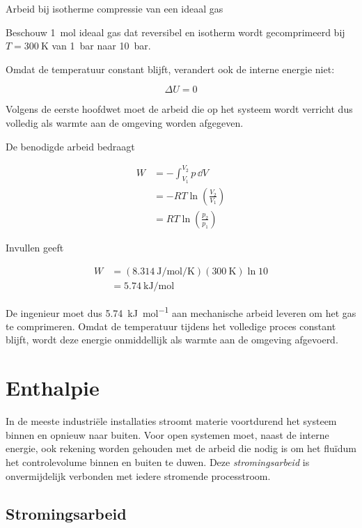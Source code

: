 \begin{voorbeeld}{Arbeid bij isotherme compressie van een ideaal gas}

Beschouw \SI{1}{\mole} ideaal gas dat reversibel en isotherm wordt gecomprimeerd bij
$T=\SI{300}{\kelvin}$ van \SI{1}{\bar} naar \SI{10}{\bar}.

Omdat de temperatuur constant blijft, verandert ook de interne energie niet:

\[
\Delta U=0
\]

Volgens de eerste hoofdwet moet de arbeid die op het systeem wordt verricht dus volledig als warmte aan de omgeving worden afgegeven.

De benodigde arbeid bedraagt

\begin{align*}
W
&= -\int_{V_1}^{V_2}p\,\dd V \\
&= -RT\ln\left(\frac{V_2}{V_1}\right) \\
&= RT\ln\left(\frac{p_2}{p_1}\right)
\end{align*}

Invullen geeft

\begin{align*}
W
&= (\SI{8.314}{\joule\per\mole\per\kelvin}) (\SI{300}{\kelvin}) \ln 10 \\
&= \SI{5.74}{\kilo\joule\per\mole}
\end{align*}

De ingenieur moet dus \SI{5.74}{\kilo\joule\per\mole} aan mechanische arbeid leveren om het gas te comprimeren. Omdat de temperatuur tijdens het volledige proces constant blijft, wordt deze energie onmiddellijk als warmte aan de omgeving afgevoerd.

\end{voorbeeld}
\section{Enthalpie}

In de meeste industri\"ele installaties stroomt materie voortdurend het systeem binnen en opnieuw naar buiten. Voor open systemen moet, naast de interne energie, ook rekening worden gehouden met de arbeid die nodig is om het flu\"idum het controlevolume binnen en buiten te duwen. Deze \emph{stromingsarbeid} is onvermijdelijk verbonden met iedere stromende processtroom.

\subsection{Stromingsarbeid}

